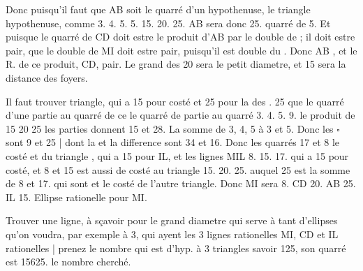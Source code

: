 \documentclass[11pt,a4paper]{article}
\begin{document}
Donc puisqu'il faut que AB soit le quarré d'un hypothenuse,  \ill{} le triangle \ill{} \ill{} \ill{} \ill{} hypothenuse, comme 3. 4. 5. \ill{} 5.  15. 20. 25. AB sera donc 25. quarré de 5. Et puisque le quarré de CD doit estre le produit d'AB par le double de   ; il doit estre pair,  que le double de  MI doit estre pair, puisqu'il est double du \struck{\ill{}}. Donc  AB , et le R. de ce produit,  CD,  pair. Le grand des \ill{} 20 sera le petit diametre, et 15 sera la distance des foyers.

Il faut trouver  triangle, qui a 15 pour costé et 25 pour la  des \ill{} \ill{} \ill{} \ill{}.  25  que le quarré \struck{\ill{}} d'une partie  \ill{} au quarré de ce  \ill{} le quarré de  partie \ill{} \ill{} au quarré \ill{} \ill{} \ill{} 3. 4. 5. 9. \ill{} le produit de 15 20 25 \ill{} \ill{} \ill{} \ill{} \ill{} les parties donnent 15 et 28. La somme de 3, 4, 5 \ill{}  à  \ill{} 3 et 5. Donc les \struck{\ill{}} $\square$ sont 9 et 25 | dont la  \struck{\ill{}} et la difference sont 34 et 16. Donc les quarrés \ill{} 17 et 8  le costé et \ill{} du triangle , qui a 15 pour IL, et les lignes MIL  8. 15. 17. qui a 15 pour costé, et 8 et 15 est aussi de costé au triangle 15. 20. 25. auquel  25 est la somme de 8 et 17. qui sont \ill{} et le costé \ill{} de l'autre triangle. Donc MI sera 8. CD 20. AB 25. IL 15. \struck{\ill{}} Ellipse rationelle \ill{} \ill{}   pour MI.

Trouver une ligne, à sçavoir pour le grand diametre qui serve à tant d'ellipses qu'on voudra, par exemple à 3, qui ayent les 3 lignes rationelles MI, CD et IL rationelles | prenez le nombre qui est d'hyp. à 3 triangles savoir 125, son quarré est 15625.  le nombre cherché.
\end{document}
